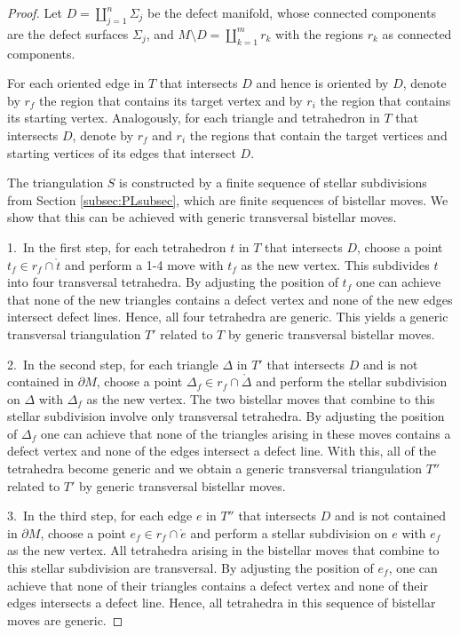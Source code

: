 \documentclass[1.5pt, a4paper]{article}
\begin{document}
\begin{proof}  Let $D=\amalg_{j=1}^n \Sigma_j$ be the defect manifold, whose connected components are the defect surfaces $\Sigma_j$, and $M\setminus D=\amalg_{k=1}^m r_k$ with the regions $r_k$ as connected components.  

For each oriented edge in $T$ that intersects $D$ and hence is  oriented by $D$,  denote by $r_f$ the region that contains its target vertex  and by  $r_i$ the region that contains its starting vertex. Analogously, for each triangle and tetrahedron  in $T$ that intersects $D$,  denote by $r_f$ and $r_i$ the regions that contain the target vertices and starting vertices of its edges that intersect $D$.




The triangulation $S$ is constructed by a finite sequence of stellar subdivisions from  Section \ref{subsec:PLsubsec}, which are finite sequences of bistellar moves. 
We show  that this can be achieved with generic transversal bistellar moves. 


1.~In the first step, 
for each tetrahedron $t$ in $T$ that intersects $D$, choose a point $t_f\in r_f\cap \mathring{t}$  and  perform a 1-4  move  with $t_f$ as the new vertex. 
This  subdivides $t$ into four transversal tetrahedra. By adjusting the position of $t_f$ one can achieve that none of the new triangles contains a defect vertex and none of the new edges intersect defect lines. Hence,  all four tetrahedra are generic. This yields a generic transversal   triangulation $T'$ related to $T$ by generic transversal bistellar moves.

2.~In the second step, for each triangle $\Delta$ in $T'$ that intersects $D$ and is not contained in $\partial M$, choose a point $\Delta_f\in r_f\cap\mathring{\Delta}$ and perform the stellar subdivision on $\Delta$ with $\Delta_f$ as the new vertex. The  two bistellar moves that combine to this stellar subdivision involve only transversal tetrahedra. By adjusting the position of $\Delta_f$ one can achieve that  none of the  triangles arising in these moves  contains a defect vertex and none of the edges  intersect a defect line. With this, all of the tetrahedra become generic and we obtain a generic transversal  triangulation $T''$ related to $T'$ by generic transversal bistellar moves. 

3.~In the third step, for each edge $e$ in $T''$ that intersects $D$ and is not contained in  $\partial M$, choose a point $e_f\in r_f\cap\mathring{e}$  and perform a stellar subdivision on $e$ with $e_f$ as the new vertex. All tetrahedra arising in the bistellar moves that combine to this stellar subdivision
 are transversal. By adjusting the position of $e_f$, one can achieve that none of their triangles  contains a defect vertex and none of their edges intersects a defect line. Hence,  all tetrahedra in this sequence of bistellar moves are generic. 


\end{proof}
\end{document}
